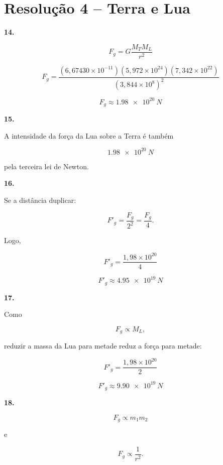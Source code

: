 \documentclass[11pt,a4paper]{article}
\begin{document}
	\section*{Resolução 4 -- Terra e Lua}
	
	\begin{solucaobox}[Questões 14--18]
		
		\textbf{14.}
		
		\[
		F_g=
		G\frac{M_TM_L}{r^2}
		\]
		
		\[
		F_g=
		\frac{
			(6{,}67430\times10^{-11})
			(5{,}972\times10^{24})
			(7{,}342\times10^{22})
		}{
			(3{,}844\times10^8)^2
		}
		\]
		
		\[
		\boxed{
			F_g\approx\SI{1.98e20}{N}
		}
		\]
		
		\vspace{3mm}
		
		\textbf{15.}
		
		A intensidade da força da Lua sobre a Terra é também
		
		\[
		\boxed{
			\SI{1.98e20}{N}
		}
		\]
		
		pela terceira lei de Newton.
		
		\vspace{3mm}
		
		\textbf{16.}
		
		Se a distância duplicar:
		
		\[
		F'_g=
		\frac{F_g}{2^2}
		=
		\frac{F_g}{4}.
		\]
		
		Logo,
		
		\[
		F'_g=
		\frac{1{,}98\times10^{20}}{4}
		\]
		
		\[
		\boxed{
			F'_g\approx\SI{4.95e19}{N}
		}
		\]
		
		\vspace{3mm}
		
		\textbf{17.}
		
		Como
		
		\[
		F_g\propto M_L,
		\]
		
		reduzir a massa da Lua para metade reduz a força para metade:
		
		\[
		F'_g=
		\frac{1{,}98\times10^{20}}{2}
		\]
		
		\[
		\boxed{
			F'_g\approx\SI{9.90e19}{N}
		}
		\]
		
		\vspace{3mm}
		
		\textbf{18.}
		
		\[
		\boxed{
			F_g\propto m_1m_2
		}
		\]
		
		e
		
		\[
		\boxed{
			F_g\propto\frac{1}{r^2}.
		}
		\]
		
	\end{solucaobox}
	
\end{document}
